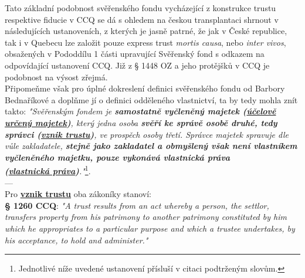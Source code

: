 \documentclass{article}
\begin{document}




Tato základní podobnost svěřenského fondu vycházející z konstrukce trustu respektive fiducie v CCQ se dá s ohledem na českou transplantaci shrnout v následujících ustanoveních, z kterých je jasně patrné, že jak v České republice, tak i v Quebecu lze založit pouze express trust \textit{mortis causa}, nebo \textit{inter vivos}, obsažených v Pododdílu 1 části upravující Svěřenský fond s odkazem na odpovídající ustanovení CCQ. Již z § 1448 OZ a jeho protějšků v CCQ je podobnost na výsost zřejmá.\\

Připomeňme však pro úplné dokreslení definici svěřenského fondu od Barbory Bednaříkové a doplňme jí o definici odděleného vlastnictví, ta by tedy mohla znít takto: \textit{"Svěřenským fondem je \textbf{samostatně vyčleněný majetek (\underline{účelově určený majetek})}, který jedna osoba \textbf{svěří ke správě osobě druhé, tedy správci (\underline{vznik trustu})}, ve prospěch osoby třetí. Správce majetek spravuje dle vůle zakladatele, \textbf{stejně jako zakladatel a obmyšlený však není vlastníkem vyčleněného majetku, pouze vykonává vlastnická práva\\ (\underline{vlastnická práva})}."}\footnote{Jednotlivé níže uvedené ustanovení přísluší v citaci podtrženým slovům.}.\\



---\\

Pro \textbf{\underline{vznik trustu}} oba zákoníky stanoví:\\

\textbf{§ 1260 CCQ}: \textit{"A trust results from an act whereby a person, the settlor, transfers property from his patrimony to another patrimony constituted by him which he appropriates to a particular purpose and which a trustee undertakes, by his acceptance, to hold and administer."}\\
\end{document}
